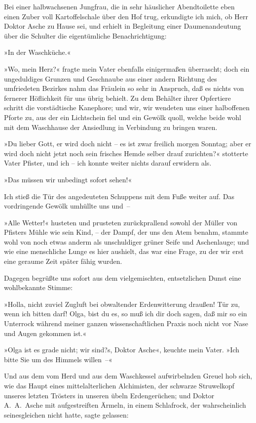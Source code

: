 Bei einer halbwachsenen Jungfrau, die in sehr häuslicher
Abendtoilette eben einen Zuber voll Kartoffelschale über den Hof
trug, erkundigte ich mich, ob Herr Doktor Asche zu Hause sei, und
erhielt in Begleitung einer Daumenandeutung über die Schulter die
eigentümliche Benachrichtigung:

»In der Waschküche.«

»Wo, mein Herz?« fragte mein Vater ebenfalls einigermaßen
überrascht; doch ein ungeduldiges Grunzen und Geschnaube aus einer
andern Richtung des umfriedeten Bezirkes nahm das Fräulein so sehr
in Anspruch, daß es nichts von fernerer Höflichkeit für uns übrig
behielt. Zu dem Behälter ihrer Opfertiere schritt die vorstädtische
Kanephore; und wir, wir wendeten uns einer halboffenen Pforte zu,
aus der ein Lichtschein fiel und ein Gewölk quoll, welche beide
wohl mit dem Waschhause der Ansiedlung in Verbindung zu bringen
waren.

»Du lieber Gott, er wird doch nicht – es ist zwar freilich morgen
Sonntag; aber er wird doch nicht jetzt noch sein frisches Hemde
selber drauf zurichten?« stotterte Vater Pfister, und ich – ich
konnte weiter nichts darauf erwidern als.

»Das müssen wir unbedingt sofort sehen!«

Ich stieß die Tür des angedeuteten Schuppens mit dem Fuße weiter
auf. Das vordringende Gewölk umhüllte uns und~–

»Alle Wetter!« husteten und prusteten zurückprallend sowohl der
Müller von Pfisters Mühle wie sein Kind, – der Dampf, der uns den
Atem benahm, stammte wohl von noch etwas anderm als unschuldiger
grüner Seife und Aschenlauge; und wie eine menschliche Lunge es
hier aushielt, das war eine Frage, zu der wir erst eine geraume
Zeit später fähig wurden.

Dagegen begrüßte uns sofort aus dem vielgemischten, entsetzlichen
Dunst eine wohlbekannte Stimme:

»Holla, nicht zuviel Zugluft bei obwaltender Erdenwitterung
draußen! Tür zu, wenn ich bitten darf! Olga, bist du es, so muß ich
dir doch sagen, daß mir so ein Unterrock während meiner ganzen
wissenschaftlichen Praxis noch nicht vor Nase und Augen gekommen
ist.«

»Olga ist es grade nicht; wir sind?s, Doktor Asche«, keuchte mein
Vater. »Ich bitte Sie um des Himmels willen~–«

Und aus dem vom Herd und aus dem Waschkessel aufwirbelnden Greuel
hob sich, wie das Haupt eines mittelalterlichen Alchimisten, der
schwarze Struwelkopf unseres letzten Trösters in unseren übeln
Erdengerüchen; und Doktor A.~A.~Asche mit aufgestreiften Ärmeln, in
einem Schlafrock, der wahrscheinlich seinesgleichen nicht hatte,
sagte gelassen:

